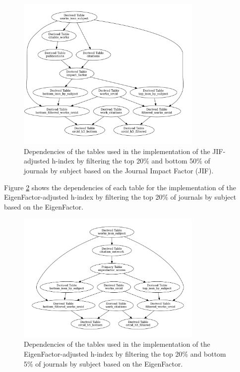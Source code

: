 \begin{figure}[H]
      \centering
      \includegraphics[width=0.8\textwidth]{../figs/impact.pdf}
      \caption{Dependencies of the tables used in the implementation of the JIF-adjusted h-index by filtering the top 20\% and bottom 50\% of journals by subject based on the Journal Impact Factor (JIF).}
      \label{fig:tables2}
\end{figure}

Figure \ref{fig:tables3} shows the dependencies of each table for the
implementation of the EigenFactor-adjusted h-index by filtering the top 20\% of
journals by subject based on the EigenFactor.

\begin{figure}[H]
      \centering
      \includegraphics[width=0.8\textwidth]{../figs/eigenfactor.pdf}
      \caption{Dependencies of the tables used in the implementation of the EigenFactor-adjusted h-index by filtering the top 20\% and bottom 5\% of journals by subject based on the EigenFactor.}
      \label{fig:tables3}
\end{figure}

